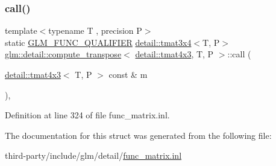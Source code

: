 \subsubsection{\texorpdfstring{call()}{call()}}
{\footnotesize\ttfamily template$<$typename T , precision P$>$ \\
static \hyperlink{setup_8hpp_a33fdea6f91c5f834105f7415e2a64407}{G\+L\+M\+\_\+\+F\+U\+N\+C\+\_\+\+Q\+U\+A\+L\+I\+F\+I\+ER} \hyperlink{structglm_1_1detail_1_1tmat3x4}{detail\+::tmat3x4}$<$T, P$>$ \hyperlink{structglm_1_1detail_1_1compute__transpose}{glm\+::detail\+::compute\+\_\+transpose}$<$ \hyperlink{structglm_1_1detail_1_1tmat4x3}{detail\+::tmat4x3}, T, P $>$\+::call (\begin{DoxyParamCaption}\item[{\hyperlink{structglm_1_1detail_1_1tmat4x3}{detail\+::tmat4x3}$<$ T, P $>$ const \&}]{m }\end{DoxyParamCaption})\hspace{0.3cm}{\ttfamily [inline]}, {\ttfamily [static]}}



Definition at line 324 of file func\+\_\+matrix.\+inl.



The documentation for this struct was generated from the following file\+:\begin{DoxyCompactItemize}
\item 
third-\/party/include/glm/detail/\hyperlink{func__matrix_8inl}{func\+\_\+matrix.\+inl}\end{DoxyCompactItemize}
